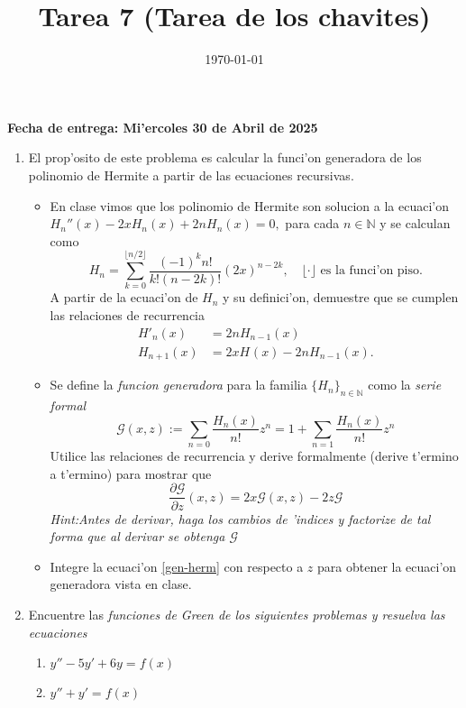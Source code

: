 \documentclass[letterpaper]{article}
\date{\today}
\title{Tarea 7 (Tarea de los chavites)}
\newcommand{\nat}{\ensuremath{ \mathbb N }}
\begin{document}
\maketitle

\textbf{Fecha de entrega: Mi'ercoles 30 de Abril de 2025}

\begin{enumerate}
  \item El prop'osito de este problema es calcular la funci'on generadora de los polinomio de Hermite a partir de las ecuaciones recursivas. 
        \begin{itemize}
          \item En clase vimos que los polinomio de Hermite son solucion a la ecuaci'on $H_{n}''(x)-2xH_{n}(x)+2nH_{n}(x)=0,$ para cada $n\in\nat$ y se calculan como
\[
      H_{n}=\sum_{k=0}^{\lfloor n/2\rfloor}\frac{(-1)^{k}n!}{k!(n-2k)!}(2x)^{n-2k},\quad\lfloor\cdot\rfloor\text{ es la funci'on piso.}
\]
          A partir de la ecuaci'on de $H_{n}$ y su definici'on, demuestre que se cumplen las relaciones de recurrencia
          \begin{align*}
            H'_{n}(x)&=2nH_{n-1}(x)\\
            H_{n+1}(x)&=2xH_{}(x)-2nH_{n-1}(x).
          \end{align*}      
          \item Se define la \emph{funcion generadora} para la familia $\{H_{n}\}_{n\in\nat}$ como la \emph{serie formal}
          \[
                \mathcal{G}(x,z):=\sum_{n=0}\frac{H_{n}(x)}{n!}z^{n}=1+\sum_{n=1}\frac{H_{n}(x)}{n!}z^{n}
          \]
                Utilice las relaciones de recurrencia y derive formalmente (derive t'ermino a t'ermino) para mostrar que
          \begin{equation}\label{gen-herm}
                \dfrac{\partial\mathcal{G}}{\partial z}(x,z)=2x\mathcal{G}(x,z)-2z\mathcal{G}
          \end{equation}
                \emph{Hint:Antes de derivar, haga los cambios de 'indices y factorize de tal forma que al derivar se obtenga $\mathcal{G}$}
          \item Integre la ecuaci'on \ref{gen-herm} con respecto a $z$ para obtener la ecuaci'on generadora vista en clase.
        \end{itemize}
  \item Encuentre las \emph{funciones de Green de los siguientes problemas y resuelva las ecuaciones}
        \begin{enumerate}
          \item $y''-5y'+6y=f(x)$
          \item $y''+y'=f(x)$
        \end{enumerate}
\end{enumerate}
\end{document}
